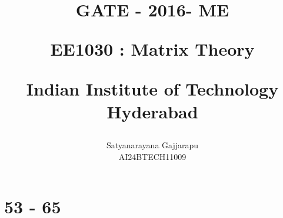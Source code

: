 \documentclass[journal]{IEEEtran}
\begin{document}

\vspace{3cm}




\title{
GATE - 2016- ME

\large{EE1030 : Matrix Theory}

Indian Institute of Technology Hyderabad
}
\author{Satyanarayana Gajjarapu

AI24BTECH11009
}	





\maketitle




\bigskip

\renewcommand{\thefigure}{\theenumi}
\renewcommand{\thetable}{\theenumi}


\section{53 - 65}
\end{document}
